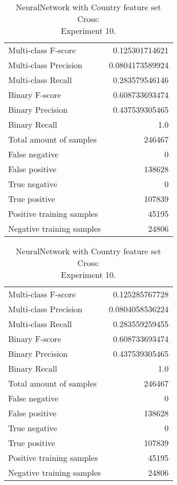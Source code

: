 \begin{table}[H]
\begin{minipage}{0.5\textwidth}
\caption{NeuralNetwork with Country feature set Cross: \\Experiment 9.}
\centering
\begin{tabular}{l r}
\toprule
Multi-class F-score & 0.125301714621 \\
Multi-class Precision & 0.0804173589924 \\
Multi-class Recall & 0.283579546146 \\
\midrule
Binary F-score & 0.608733693474 \\
Binary Precision & 0.437539305465 \\
Binary Recall & 1.0 \\
\midrule
Total amount of samples & 246467 \\
False negative & 0 \\
False positive & 138628 \\
True negative & 0 \\
True positive & 107839 \\
\midrule
Positive training samples & 45195 \\
Negative training samples & 24806 \\
\bottomrule
\end{tabular}
\end{minipage}
\hfillx
\begin{minipage}{0.5\textwidth}
\caption{NeuralNetwork with Country feature set Cross: \\Experiment 10.}
\centering
\begin{tabular}{l r}
\toprule
Multi-class F-score & 0.125285767728 \\
Multi-class Precision & 0.0804058536224 \\
Multi-class Recall & 0.283559259455 \\
\midrule
Binary F-score & 0.608733693474 \\
Binary Precision & 0.437539305465 \\
Binary Recall & 1.0 \\
\midrule
Total amount of samples & 246467 \\
False negative & 0 \\
False positive & 138628 \\
True negative & 0 \\
True positive & 107839 \\
\midrule
Positive training samples & 45195 \\
Negative training samples & 24806 \\
\bottomrule
\end{tabular}
\end{minipage}
\end{table}
